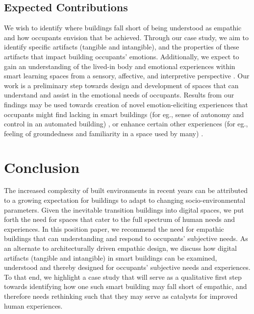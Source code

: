 \documentclass [sigconf, review, anonymous] {acmart}
\begin{document}
\subsection{Expected Contributions}
We wish to identify where buildings fall short of being understood as empathic and how occupants envision that be achieved. Through our case study, we aim to identify specific artifacts (tangible and intangible), and the properties of these artifacts that impact building occupants' emotions. Additionally, we expect to gain an understanding of the lived-in body and emotional experiences within smart learning spaces from a sensory, affective, and interpretive perspective \cite{giaccardi2015foundations}. 
Our work is a preliminary step towards design and development of spaces that can understand and assist in the emotional needs of occupants. Results from our findings may be used towards creation of novel emotion-eliciting experiences that occupants might find lacking in smart buildings (for eg., sense of autonomy and control in an automated building) \cite{moreno2014user}, or enhance certain other experiences (for eg., feeling of groundedness and familiarity in a space used by many) \cite{rehman2022personalisedcomfort}.  
\section{Conclusion}
The increased complexity of built environments in recent years can be attributed to a growing expectation for buildings to adapt to changing socio-environmental parameters. Given the inevitable transition buildings into digital spaces, we put forth the need for spaces that cater to the full spectrum of human needs and experiences. In this position paper, we recommend the need for empathic buildings that can understanding and respond to occupants' subjective needs. As an alternate to architecturally driven empathic design, we discuss how digital artifacts (tangible and intangible) in smart buildings can be examined, understood and thereby designed for occupants' subjective needs and experiences. To that end, we highlight a case study that will serve as a qualitative first step towards identifying how one such smart building may fall short of empathic, and therefore needs rethinking such that they may serve as catalysts for improved human experiences. 



\end{document}
